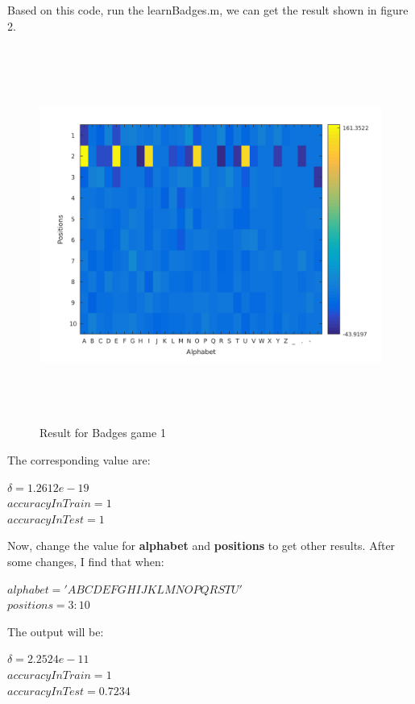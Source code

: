 \begin{enumerate}
\begin{enumerate}
\begin{enumerate}
Based on this code, run the learnBadges.m, we can get the result shown in figure 2.\\
\begin{figure}[h]
\centering
\includegraphics[height = 350pt]{badges.png}
\caption{Result for Badges game 1}
\end{figure}

The corresponding value are:\\
\begin{center}
$\delta = 1.2612e-19$\\
$accuracyInTrain = 1$\\
$accuracyInTest = 1$\\
\end{center}

Now, change the value for {\bf alphabet} and {\bf positions} to get other results. After some changes, I find that when:\\
\begin{center}
$alphabet = 'ABCDEFGHIJKLMNOPQRSTU'$\\
$positions = 3:10$\\
\end{center} 

The output will be:\\
\begin{center}
$\delta = 2.2524e-11$\\
$accuracyInTrain = 1$\\
$accuracyInTest = 0.7234$\\
\end{center}


\end{enumerate}
\end{enumerate}
\end{enumerate}
